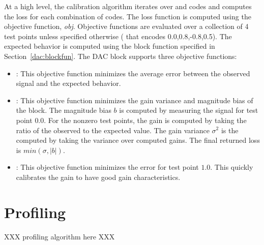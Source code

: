 \begin{algorithmic}
    \EndFor
  \EndFor

  \EndFor
\end{algorithmic}

At a high level, the calibration algorithm iterates over  and
 codes and computes the loss for each combination of codes. The
loss function is computed using the objective function, \textit{obj}. Objective
functions are evaluated over a collection of 4
test points unless specified otherwise ( that encodes
0.0,0.8,-0.8,0.5). The expected behavior is computed using the block function
specified in Section~\ref{dac:blockfun}. The DAC block supports three objective functions:
\begin{itemize}
\item{}: This objective function minimizes the average
  error between the observed signal and the expected behavior. 
\item{}: This objective function minimizes the gain
  variance and magnitude bias of the block. The magnitude bias $b$ is computed
  by measuring the signal for test point $0.0$. For the nonzero test
  points, the gain is computed by taking the ratio of the observed to the
  expected value. The gain variance $\sigma^2$ is the computed by taking the
  variance over computed gains. The final returned loss is $min(\sigma,|b|)$.
  \item{}: This objective function minimizes the error for test
    point $1.0$. This quickly calibrates the gain to have good gain characteristics.
  \end{itemize}
  
\section{Profiling}

XXX profiling algorithm here XXX